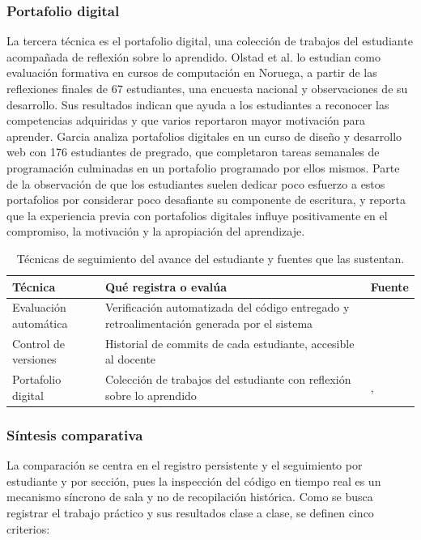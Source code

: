 \subsubsection{Portafolio digital}
La tercera técnica es el portafolio digital, una colección de trabajos del estudiante acompañada de reflexión sobre lo aprendido. Olstad et al. \cite{olstad2025eportfolios} lo estudian como evaluación formativa en cursos de computación en Noruega, a partir de las reflexiones finales de 67 estudiantes, una encuesta nacional y observaciones de su desarrollo. Sus resultados indican que ayuda a los estudiantes a reconocer las competencias adquiridas y que varios reportaron mayor motivación para aprender. Garcia \cite{garcia2025portfolios} analiza portafolios digitales en un curso de diseño y desarrollo web con 176 estudiantes de pregrado, que completaron tareas semanales de programación culminadas en un portafolio programado por ellos mismos. Parte de la observación de que los estudiantes suelen dedicar poco esfuerzo a estos portafolios por considerar poco desafiante su componente de escritura, y reporta que la experiencia previa con portafolios digitales influye positivamente en el compromiso, la motivación y la apropiación del aprendizaje.

\begin{table}[H]
\centering
\caption{Técnicas de seguimiento del avance del estudiante y fuentes que las sustentan.}
\label{tab:tecnicas_seguimiento}
\small
\begin{tabular}{p{} p{} p{}}
\toprule
\textbf{Técnica} & \textbf{Qué registra o evalúa} & \textbf{Fuente} \\
\midrule
Evaluación automática & Verificación automatizada del código entregado y retroalimentación generada por el sistema & \cite{paiva2022automated} \\
Control de versiones & Historial de commits de cada estudiante, accesible al docente & \cite{tu2022github} \\
Portafolio digital & Colección de trabajos del estudiante con reflexión sobre lo aprendido & \cite{olstad2025eportfolios}, \cite{garcia2025portfolios} \\
\bottomrule
\end{tabular}
\end{table}

\subsubsection{Síntesis comparativa}
La comparación se centra en el registro persistente y el seguimiento por estudiante y por sección, pues la inspección del código en tiempo real es un mecanismo síncrono de sala y no de recopilación histórica. Como se busca registrar el trabajo práctico y sus resultados clase a clase, se definen cinco criterios:

